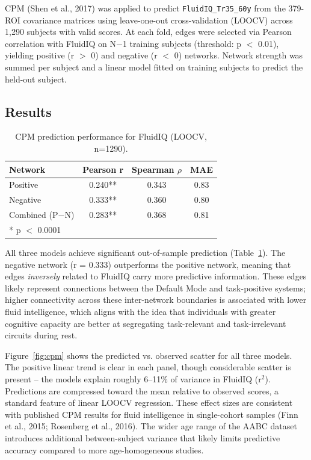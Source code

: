 \documentclass[10pt,twocolumn]{article}
\begin{document}
CPM (Shen et al., 2017) was applied to predict \texttt{FluidIQ\_Tr35\_60y} from the 379-ROI covariance matrices using leave-one-out cross-validation (LOOCV) across 1,290 subjects with valid scores. At each fold, edges were selected via Pearson correlation with FluidIQ on N$-$1 training subjects (threshold: p $<$ 0.01), yielding positive (r $>$ 0) and negative (r $<$ 0) networks. Network strength was summed per subject and a linear model fitted on training subjects to predict the held-out subject.

\subsection{Results}

\begin{table}[h]
\centering
\small
\caption{CPM prediction performance for FluidIQ (LOOCV, n=1290).}
\label{tab:cpm}
\begin{tabular}{lccc}
\toprule
\textbf{Network} & \textbf{Pearson r} & \textbf{Spearman $\rho$} & \textbf{MAE} \\
\midrule
Positive          & 0.240** & 0.343 & 0.83 \\
Negative          & 0.333** & 0.360 & 0.80 \\
Combined (P$-$N)  & 0.283** & 0.368 & 0.81 \\
\bottomrule
\multicolumn{4}{l}{\small ** p $<$ 0.0001}
\end{tabular}
\end{table}

All three models achieve significant out-of-sample prediction (Table~\ref{tab:cpm}). The negative network (r = 0.333) outperforms the positive network, meaning that edges \textit{inversely} related to FluidIQ carry more predictive information. These edges likely represent connections between the Default Mode and task-positive systems; higher connectivity across these inter-network boundaries is associated with lower fluid intelligence, which aligns with the idea that individuals with greater cognitive capacity are better at segregating task-relevant and task-irrelevant circuits during rest.

Figure~\ref{fig:cpm} shows the predicted vs. observed scatter for all three models. The positive linear trend is clear in each panel, though considerable scatter is present -- the models explain roughly 6--11\% of variance in FluidIQ (r$^2$). Predictions are compressed toward the mean relative to observed scores, a standard feature of linear LOOCV regression. These effect sizes are consistent with published CPM results for fluid intelligence in single-cohort samples (Finn et al., 2015; Rosenberg et al., 2016). The wider age range of the AABC dataset introduces additional between-subject variance that likely limits predictive accuracy compared to more age-homogeneous studies.
\end{document}
